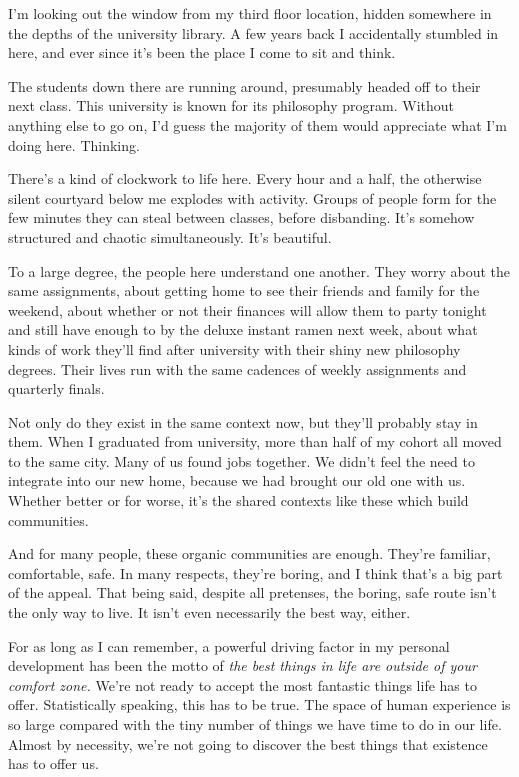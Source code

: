 \documentclass[]{book}
\begin{document}
\qquad

\qquad

I'm looking out the window from my third floor location, hidden somewhere in the
depths of the university library. A few years back I accidentally stumbled in
here, and ever since it's been the place I come to sit and think.

The students down there are running around, presumably headed off to their next
class. This university is known for its philosophy program. Without anything
else to go on, I'd guess the majority of them would appreciate what I'm doing
here. Thinking.

There's a kind of clockwork to life here. Every hour and a half, the otherwise
silent courtyard below me explodes with activity. Groups of people form for the
few minutes they can steal between classes, before disbanding. It's somehow
structured and chaotic simultaneously. It's beautiful.

To a large degree, the people here understand one another. They worry about the
same assignments, about getting home to see their friends and family for the
weekend, about whether or not their finances will allow them to party tonight
and still have enough to by the deluxe instant ramen next week, about what kinds
of work they'll find after university with their shiny new philosophy degrees.
Their lives run with the same cadences of weekly assignments and quarterly
finals.

Not only do they exist in the same context now, but they'll probably stay in
them. When I graduated from university, more than half of my cohort all moved to
the same city. Many of us found jobs together. We didn't feel the need to
integrate into our new home, because we had brought our old one with us. Whether
better or for worse, it's the shared contexts like these which build
communities.

And for many people, these organic communities are enough. They're familiar,
comfortable, safe. In many respects, they're boring, and I think that's a big
part of the appeal. That being said, despite all pretenses, the boring, safe
route isn't the only way to live. It isn't even necessarily the best way,
either.

For as long as I can remember, a powerful driving factor in my personal
development has been the motto of \emph{the best things in life are outside of
your comfort zone.} We're not ready to accept the most fantastic things life has
to offer. Statistically speaking, this has to be true. The space of human
experience is so large compared with the tiny number of things we have time to
do in our life.  Almost by necessity, we're not going to discover the best
things that existence has to offer us.
\end{document}

